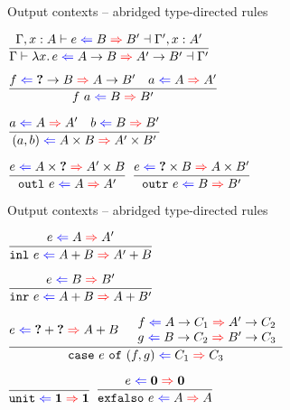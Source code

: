 \documentclass{beamer}
\begin{document}
\begin{frame}{Output contexts -- abridged type-directed rules}

\begin{center}
  $\infrule{\fulloutctx{\extend{\Gamma}{x}{A}}{e}{B}{B'}{\extend{\Gamma'}{x}{A'}}}{\outctx{\fun{x}{e}}{\Fun{A}{B}}{\Fun{A'}{B'}}}$

  \vspace{1em}

  $\infrule{\shortoutctx{f}{\Fun{\Hole}{B}}{\Fun{A}{B'}} \quad \shortoutctx{a}{A}{A'}}{\shortoutctx{\app{f}{a}}{B}{B'}}$

  \vspace{1em}

  $\infrule{\shortoutctx{a}{A}{A'} \quad \shortoutctx{b}{B}{B'}}{\shortoutctx{\pair{a}{b}}{\Prod{A}{B}}{\Prod{A'}{B'}}}$

  \vspace{1em}

  $\infrule{\shortoutctx{e}{\Prod{A}{\Hole}}{\Prod{A'}{B}}}{\shortoutctx{\outl{e}}{A}{A'}}$
  \quad
  $\infrule{\shortoutctx{e}{\Prod{\Hole}{B}}{\Prod{A}{B'}}}{\shortoutctx{\outr{e}}{B}{B'}}$
\end{center}

\end{frame}

\begin{frame}{Output contexts -- abridged type-directed rules}

\begin{center}
  $\infrule{\shortoutctx{e}{A}{A'}}{\shortoutctx{\inl{e}}{\Sum{A}{B}}{\Sum{A'}{B}}}$

  \vspace{2em}

  $\infrule{\shortoutctx{e}{B}{B'}}{\shortoutctx{\inr{e}}{\Sum{A}{B}}{\Sum{A}{B'}}}$

  \vspace{2em}

  $\infrule{\shortoutctx{e}{\Sum{\Hole}{\Hole}}{\Sum{A}{B}} \quad \begin{array}{c} \shortoutctx{f}{\Fun{A}{C_1}}{\Fun{A'}{C_2}} \\ \shortoutctx{g}{\Fun{B}{C_2}}{\Fun{B'}{C_3}} \end{array}}{\shortoutctx{\case{e}{f}{g}}{C_1}{C_3}}$

  \vspace{2em}

  $\infrule{}{\shortoutctx{\unit}{\Unit}{\Unit}}$ \quad
  $\infrule{\shortoutctx{e}{\Empty}{\Empty}}{\shortoutctx{\exfalso{e}}{A}{A}}$
\end{center}

\end{frame}
\end{document}

